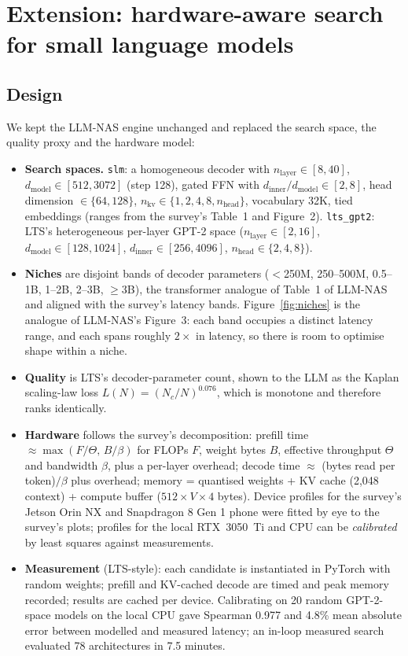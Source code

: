 \documentclass[11pt,a4paper]{article}
\newcommand{\code}[1]{\texttt{#1}}
\begin{document}
\section{Extension: hardware-aware search for small language models}\label{sec:blend}

\subsection{Design}
We kept the LLM-NAS engine unchanged and replaced the search space, the quality proxy and the hardware model:
\begin{itemize}[nosep]
  \item \textbf{Search spaces.} \code{slm}: a homogeneous decoder with $n_{\text{layer}}\in[8,40]$, $d_{\text{model}}\in[512,3072]$ (step 128), gated FFN with $d_{\text{inner}}/d_{\text{model}}\in[2,8]$, head dimension $\in\{64,128\}$, $n_{\text{kv}}\in\{1,2,4,8,n_{\text{head}}\}$, vocabulary 32K, tied embeddings (ranges from the survey's Table~1 and Figure~2). \code{lts\_gpt2}: LTS's heterogeneous per-layer GPT-2 space ($n_{\text{layer}}\in[2,16]$, $d_{\text{model}}\in[128,1024]$, $d_{\text{inner}}\in[256,4096]$, $n_{\text{head}}\in\{2,4,8\}$).
  \item \textbf{Niches} are disjoint bands of decoder parameters ($<$250M, 250--500M, 0.5--1B, 1--2B, 2--3B, $\ge$3B), the transformer analogue of Table~1 of LLM-NAS and aligned with the survey's latency bands. Figure~\ref{fig:niches} is the analogue of LLM-NAS's Figure~3: each band occupies a distinct latency range, and each spans roughly $2\times$ in latency, so there is room to optimise shape within a niche.
  \item \textbf{Quality} is LTS's decoder-parameter count, shown to the LLM as the Kaplan scaling-law loss $L(N)=(N_c/N)^{0.076}$, which is monotone and therefore ranks identically.
  \item \textbf{Hardware} follows the survey's decomposition: prefill time $\approx\max(F/\Theta,\,B/\beta)$ for FLOPs $F$, weight bytes $B$, effective throughput $\Theta$ and bandwidth $\beta$, plus a per-layer overhead; decode time $\approx$ (bytes read per token)$/\beta$ plus overhead; memory = quantised weights + KV cache (2{,}048 context) + compute buffer ($512\times V\times4$ bytes). Device profiles for the survey's Jetson Orin NX and Snapdragon 8 Gen 1 phone were fitted by eye to the survey's plots; profiles for the local RTX~3050~Ti and CPU can be \emph{calibrated} by least squares against measurements.
  \item \textbf{Measurement} (LTS-style): each candidate is instantiated in PyTorch with random weights; prefill and KV-cached decode are timed and peak memory recorded; results are cached per device. Calibrating on 20 random GPT-2-space models on the local CPU gave Spearman 0.977 and 4.8\% mean absolute error between modelled and measured latency; an in-loop measured search evaluated 78 architectures in 7.5 minutes.

\end{itemize}
\end{document}
